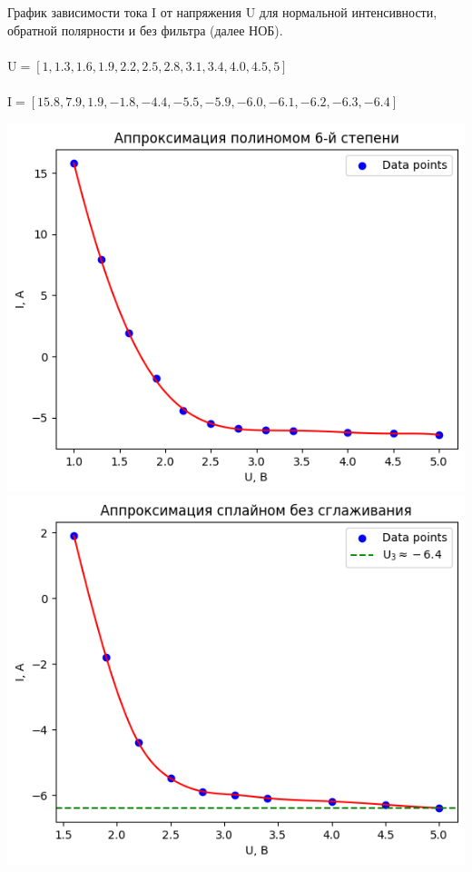 \documentclass[12pt,openany]{book}
\begin{document}
\newpage

\noindent График зависимости тока I от напряжения U для нормальной интенсивности, 
обратной полярности и без фильтра (далее НОБ).\\\\
$\text{U} = [1, 1.3, 1.6, 1.9, 2.2, 2.5, 2.8, 3.1, 3.4, 4.0, 4.5, 5]$\\\\
$\text{I} = [15.8, 7.9, 1.9, -1.8, -4.4, -5.5, -5.9, -6.0, -6.1, -6.2, -6.3, -6.4]$\\

\begin{center}
    \includegraphics[scale=0.59]{7} \\

    \includegraphics[scale=0.59]{8} \\
\end{center}
\end{document}
